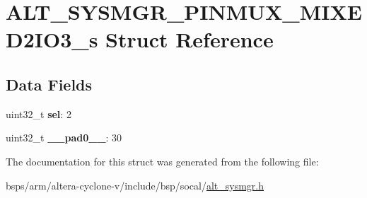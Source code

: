 \hypertarget{structALT__SYSMGR__PINMUX__MIXED2IO3__s}{}\section{A\+L\+T\+\_\+\+S\+Y\+S\+M\+G\+R\+\_\+\+P\+I\+N\+M\+U\+X\+\_\+\+M\+I\+X\+E\+D2\+I\+O3\+\_\+s Struct Reference}
\label{structALT__SYSMGR__PINMUX__MIXED2IO3__s}
\subsection*{Data Fields}
\begin{DoxyCompactItemize}
\item 
\mbox{\label{structALT__SYSMGR__PINMUX__MIXED2IO3__s_a61f0080e21f6cf790a35298537a43d70}} 
uint32\+\_\+t {\bfseries sel}\+: 2
\item 
\mbox{\label{structALT__SYSMGR__PINMUX__MIXED2IO3__s_a36be149689e246fb2c0308104657f696}} 
uint32\+\_\+t {\bfseries \+\_\+\+\_\+pad0\+\_\+\+\_\+}\+: 30
\end{DoxyCompactItemize}


The documentation for this struct was generated from the following file\+:\begin{DoxyCompactItemize}
\item 
bsps/arm/altera-\/cyclone-\/v/include/bsp/socal/\mbox{\hyperlink{alt__sysmgr_8h}{alt\+\_\+sysmgr.\+h}}\end{DoxyCompactItemize}
